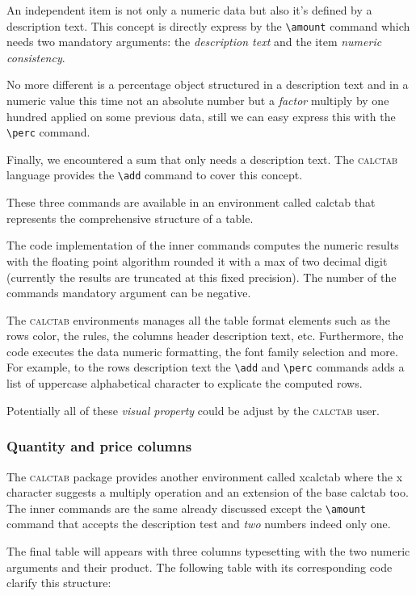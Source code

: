 \documentclass[a4paper]{article}
\newcommand{\ct}{\textsc{calctab}} %
\newcommand{\env}[1]{\textsf{#1}}
\begin{document}
An independent item is not only a numeric data but also it's defined by a description text. This concept is directly express by the \verb=\amount= command which needs two mandatory arguments: the \emph{description text} and the item \emph{numeric consistency}.

No more different is a percentage object structured in a description text and in a numeric value this time not an absolute number but a \emph{factor} multiply by one hundred applied on some previous data, still we can easy express this with the \verb=\perc= command.

Finally, we encountered a sum that only needs a description text. The \ct{} language provides the \verb=\add= command to cover this concept.

These three commands are available in an environment called \env{calctab} that represents the comprehensive structure of a table.

The code implementation of the inner commands computes the numeric results with the floating point algorithm rounded it with a max of two decimal digit (currently the results are truncated at this fixed precision).
The number of the commands mandatory argument can be negative.

The \ct{} environments manages all the table format elements such as the rows color, the rules, the columns header description text, etc. Furthermore, the code executes the data numeric formatting, the font family selection and more. For example, to the rows description text the \verb=\add= and \verb=\perc= commands adds a list of uppercase alphabetical character to explicate the computed rows.

Potentially all of these \emph{visual property} could be adjust by the \ct{} user.

%
\subsubsection{Quantity and price columns}
The \ct{} package provides another environment called \env{xcalctab} where the \env{x} character suggests a multiply operation and an extension of the base \env{calctab} too.
The inner commands are the same already discussed except the \verb=\amount= command that accepts the description test and \emph{two} numbers indeed only one.

The final table will appears with three columns typesetting with the two numeric arguments and their product. The following table with its corresponding code clarify this structure:
\end{document}

